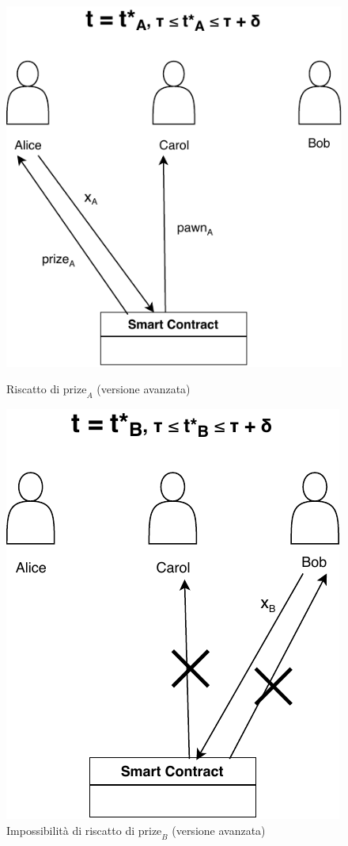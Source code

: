 \begin{figure}[H]
	\begin{minipage}{0.45\textwidth}
		\centering
		\includegraphics[width=.8\linewidth]{images/chap_protocollo/avanzato-leak-2-a.pdf}
		\caption{Riscatto di $ \text{prize}_A $ (versione avanzata)}
	\end{minipage}\hfill
	\begin{minipage}{0.45\textwidth}
		\centering
		\includegraphics[width=.71\linewidth]{images/chap_protocollo/avanzato-leak-2-b.pdf}
		\caption{Impossibilità di riscatto di $ \text{prize}_B $ (versione avanzata)}
	\end{minipage}
\end{figure}

